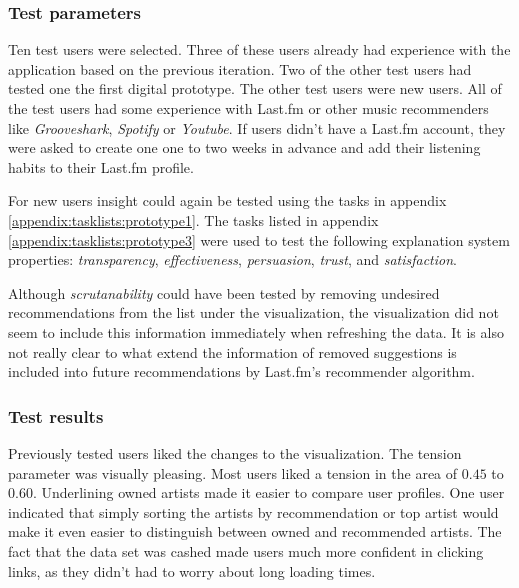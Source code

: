\subsubsection{Test parameters}\label{chapter:prototype:section:soundsuggest3:setup}

Ten test users were selected. Three of these users already had experience with the application based on the previous iteration. Two of the other test users had tested one the first digital prototype. The other test users were new users. All of the test users had some experience with Last.fm or other music recommenders like \emph{Grooveshark}, \emph{Spotify} or \emph{Youtube}. If users didn't have a Last.fm account, they were asked to create one one to two weeks in advance and add their listening habits to their Last.fm profile.


For new users insight could again be tested using the tasks in appendix \ref{appendix:tasklists:prototype1}. The tasks listed in appendix \ref{appendix:tasklists:prototype3} were used to test the following explanation system properties: \emph{transparency}, \emph{effectiveness}, \emph{persuasion}, \emph{trust}, and \emph{satisfaction}.

Although \emph{scrutanability} could have been tested by removing undesired recommendations from the list under the visualization, the visualization did not seem to include this information immediately when refreshing the data. It is also not really clear to what extend the information of removed suggestions is included into future recommendations by Last.fm's recommender algorithm.



\subsubsection{Test results}\label{chapter:prototype:section:soundsuggest3:results}

Previously tested users liked the changes to the visualization. The tension parameter was visually pleasing. Most users liked a tension in the area of $0.45$ to $0.60$. Underlining owned artists made it easier to compare user profiles. One user indicated that simply sorting the artists by recommendation or top artist would make it even easier to distinguish between owned and recommended artists. The fact that the data set was cashed made users much more confident in clicking links, as they didn't had to worry about long loading times.

